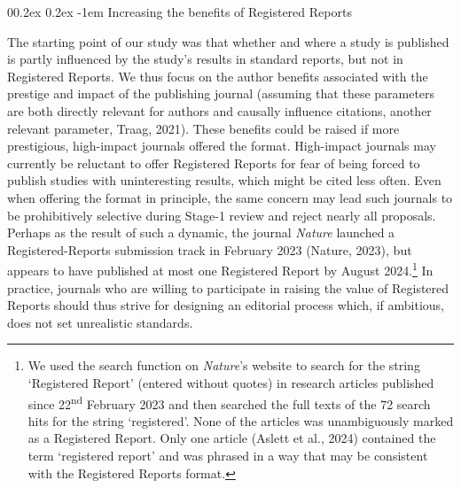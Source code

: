 \documentclass[
  ,man,mask,floatsintext]{apa6}
\makeatletter
\let\oldparagraph\paragraph
\renewcommand{\paragraph}[1]{\oldparagraph{#1}\mbox{}}
\renewcommand{\paragraph}{\@startsection{paragraph}{4}{\parindent}%
  {0\baselineskip \@plus 0.2ex \@minus 0.2ex}%
  {-1em}%
  {\normalfont\normalsize\bfseries\itshape\typesectitle}}
\makeatother
\begin{document}
\par\vspace{0.4\baselineskip}

\hypertarget{increasing-the-benefits-of-registered-reports}{%
\paragraph{Increasing the benefits of Registered Reports}\label{increasing-the-benefits-of-registered-reports}}

The starting point of our study was that
whether and where a study is published is partly influenced by the study's results in standard reports, but not in Registered Reports.
We thus focus on the author benefits associated with the prestige and impact of the publishing journal (assuming that these parameters are both directly relevant for authors and causally influence citations, another relevant parameter, Traag, 2021).
These benefits could be raised if more prestigious, high-impact journals offered the format.
High-impact journals may currently be reluctant to offer
Registered Reports for fear of being forced to publish studies with uninteresting results, which might be cited less often.
Even when offering the format in principle, the same concern may lead such journals to be prohibitively selective during Stage-1 review and reject nearly all proposals.
Perhaps as the result of such a dynamic, the journal \emph{Nature} launched a Registered-Reports submission track in February 2023 (Nature, 2023), but appears to have published at most one Registered Report by August 2024.\footnote{We used the search function on \emph{Nature}'s website to search for the string `Registered Report' (entered without quotes) in research articles published since 22\textsuperscript{nd} February 2023 and then searched the full texts of the 72 search hits for the string `registered'. None of the articles was unambiguously marked as a Registered Report. Only one article (Aslett et al., 2024) contained the term `registered report' and was phrased in a way that may be consistent with the Registered Reports format.}
In practice, journals who are willing to participate in raising the value of Registered Reports should thus strive for designing an editorial process which, if ambitious, does not set unrealistic standards.
\end{document}
